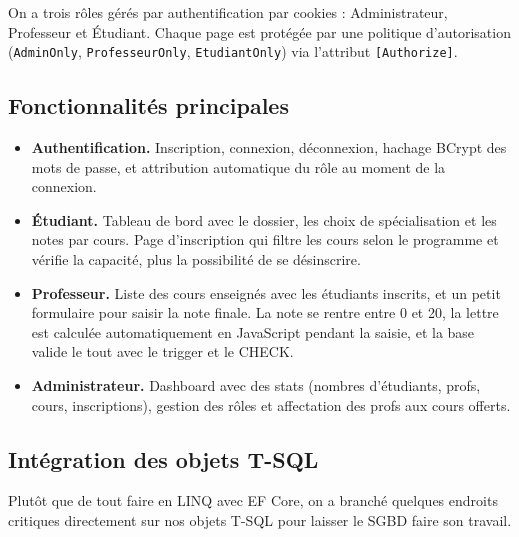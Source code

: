 \documentclass[11pt,a4paper]{article}
\begin{document}
On a trois rôles gérés par authentification par cookies :
Administrateur, Professeur et Étudiant. Chaque page est protégée par
une politique d'autorisation (\texttt{AdminOnly},
\texttt{ProfesseurOnly}, \texttt{EtudiantOnly}) via l'attribut
\texttt{[Authorize]}.

\subsection{Fonctionnalités principales}

\begin{itemize}
    \item \textbf{Authentification.} Inscription, connexion,
        déconnexion, hachage BCrypt des mots de passe, et attribution
        automatique du rôle au moment de la connexion.
    \item \textbf{Étudiant.} Tableau de bord avec le dossier, les choix
        de spécialisation et les notes par cours. Page d'inscription
        qui filtre les cours selon le programme et vérifie la capacité,
        plus la possibilité de se désinscrire.
    \item \textbf{Professeur.} Liste des cours enseignés avec les
        étudiants inscrits, et un petit formulaire pour saisir la note
        finale. La note se rentre entre 0 et 20, la lettre est
        calculée automatiquement en JavaScript pendant la saisie, et
        la base valide le tout avec le trigger et le CHECK.
    \item \textbf{Administrateur.} Dashboard avec des stats
        (nombres d'étudiants, profs, cours, inscriptions), gestion des
        rôles et affectation des profs aux cours offerts.
\end{itemize}

\subsection{Intégration des objets T-SQL}

Plutôt que de tout faire en LINQ avec EF Core, on a branché quelques
endroits critiques directement sur nos objets T-SQL pour laisser le
SGBD faire son travail.
\end{document}
